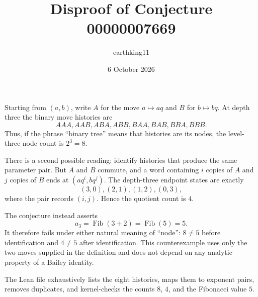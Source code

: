 \documentclass[11pt]{article}
\title{Disproof of Conjecture 00000007669}
\author{earthking11}
\date{6 October 2026}
\begin{document}
\maketitle

Starting from $(a,b)$, write $A$ for the move $a\mapsto aq$ and $B$ for
$b\mapsto bq$.  At depth three the binary move histories are
\[
 AAA,AAB,ABA,ABB,BAA,BAB,BBA,BBB.
\]
Thus, if the phrase ``binary tree'' means that histories are its nodes, the
level-three node count is $2^3=8$.

There is a second possible reading: identify histories that produce the same
parameter pair.  But $A$ and $B$ commute, and a word containing $i$ copies of
$A$ and $j$ copies of $B$ ends at $(aq^i,bq^j)$.  The depth-three endpoint
states are exactly
\[
 (3,0),(2,1),(1,2),(0,3),
\]
where the pair records $(i,j)$.  Hence the quotient count is $4$.

The conjecture instead asserts
\[
 a_3=\operatorname{Fib}(3+2)=\operatorname{Fib}(5)=5.
\]
It therefore fails under either natural meaning of ``node'': $8\ne5$ before
identification and $4\ne5$ after identification.  This counterexample uses
only the two moves supplied in the definition and does not depend on any
analytic property of a Bailey identity.

The Lean file exhaustively lists the eight histories, maps them to exponent
pairs, removes duplicates, and kernel-checks the counts $8$, $4$, and the
Fibonacci value $5$.
\end{document}
